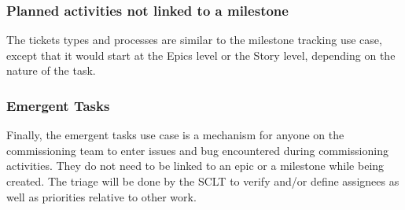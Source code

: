 \documentclass[SE,authoryear,toc]{lsstdoc}
\begin{document}
\subsubsection{Planned activities not linked to a milestone}
The tickets types and processes are similar to the milestone tracking use case, except that it would start at the Epics level or the Story level, depending on the nature of the task. 

\subsubsection{Emergent Tasks}
Finally, the emergent tasks use case is a mechanism for anyone on the commissioning team to enter issues and bug encountered during commissioning activities. They do not need to be linked to an epic or a milestone while being created. The triage will be done by the SCLT to verify and/or define assignees as well as priorities relative to other work. 
\end{document}
